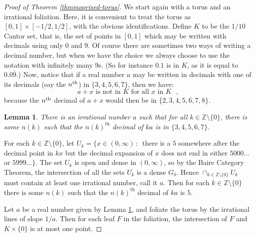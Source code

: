 \documentclass{amsart}
\newtheorem{lemma}[theorem]{Lemma}
\begin{document}
\begin{proof}[Proof of Theorem \ref{thmmoorised-torus}]
We start again with a torus and an irrational foliation. Here, it is convenient to treat the torus as $[0,1]\times [-1/2,1/2]$, with the obvious identifications. Define $K$ to be the $1/10$ Cantor set, that is, the set of points in $[0,1]$ which may be written with decimals using only $0$ and $9$. Of course there are sometimes two ways of writing a decimal number, but when we have the choice we always choose to use the notation with infinitely many $9$s. (So for instance $0.1$ is in $K$, as it is equal to $0.0\bar{9}$.) Now, notice that if a real number $a$ may be written in decimals with one of its decimals (say the $n^{\rm th}$) in $\{3,4,5,6,7\}$, then we have:
\begin{equation}\label{axnotinK}
  a + x \textrm{ is not in $K$ for all $x$ in $K$ },
\end{equation}
because the $n^{\rm th}$ decimal of $a + x$ would then be in
$\{2,3,4,5,6,7,8\}$.

\begin{lemma}\label{aexists}
  There is an irrational number $a$ such that for all $k\in{\mathbb Z}\setminus\{0\}$, there is some $n(k)$ such that the $n(k)^\text{th}$ decimal of $ka$ is in $\{3,4,5,6,7\}$.
\end{lemma}
\proof
  For each $k\in {\mathbb Z}\setminus\{0\}$,
  let $U_k=\{x\in(0,\infty)\,:\, $ there is a $5$ somewhere after the decimal point in $kx$
  but the decimal expansion of $x$ does not end in either $5000\dots$ or $5999\dots\}$.
  The set $U_k$ is open and dense in $(0,\infty)$, so by the Baire Category Theorem, 
  the intersection of all the sets $U_k$ is a dense $G_\delta$. Hence $\cap_{k\in{\mathbb Z}\setminus\{0\}}U_k$ must contain at least one irrational number, call it $a$. 
  Then for each $k\in{\mathbb Z}\setminus\{0\}$ there is some $n(k)$ such that the $n(k)^\text{th}$ decimal of $ka$ is $5$.
\endproof

Let $a$ be a real number given by Lemma \ref{aexists}, and foliate the torus by the irrational lines of slope $1/a$. Then
for each leaf $F$ in the foliation, the intersection of $F$
and $K\times\{0\}$ is at most one point.


\end{proof}
\end{document}
